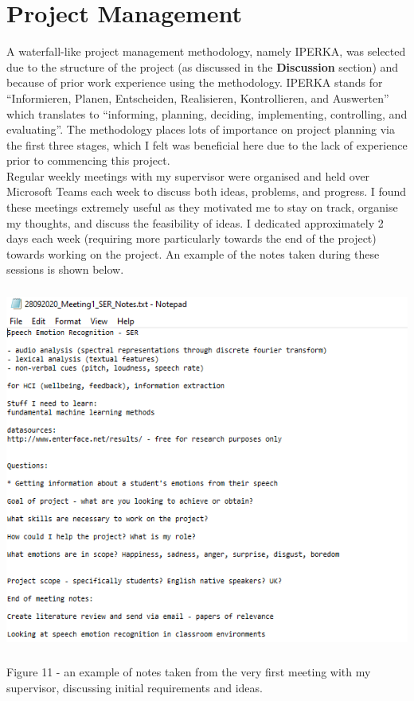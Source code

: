 \documentclass[12pt]{article}
\begin{document}
\section{Project Management}
A waterfall-like project management methodology, namely IPERKA, was selected due to the structure of the project (as discussed in the \textbf{Discussion} section) and because of prior work experience using the methodology. IPERKA stands for ``Informieren, Planen, Entscheiden, Realisieren, Kontrollieren, and Auswerten'' which translates to ``informing, planning, deciding, implementing, controlling, and evaluating''. The methodology places lots of importance on project planning via the first three stages, which I felt was beneficial here due to the lack of experience prior to commencing this project.
\\

\noindent Regular weekly meetings with my supervisor were organised and held over Microsoft Teams each week to discuss both ideas, problems, and progress. I found these meetings extremely useful as they motivated me to stay on track, organise my thoughts, and discuss the feasibility of ideas. I dedicated approximately 2 days each week (requiring more particularly towards the end of the project) towards working on the project. An example of the notes taken during these sessions is shown below.
\begin{center}
\includegraphics[width=15cm, height=12cm]{figure_11_notes}
\end{center}
Figure 11 - an example of notes taken from the very first meeting with my supervisor, discussing initial requirements and ideas.
\newpage
\end{document}
